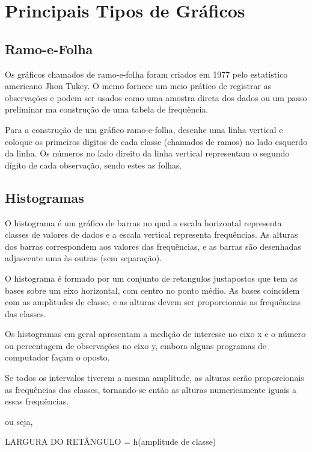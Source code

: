 \newpage
\section{Principais Tipos de Gráficos}

\subsection{Ramo-e-Folha}

Os gráficos chamados de ramo-e-folha foram criados em 1977 pelo estatístico americano Jhon Tukey. O memo fornece um meio prático de registrar as observações e podem ser usados como uma amostra direta dos dados ou um passo preliminar ma construção de uma tabela de frequência.\vskip0.3cm

Para a construção de um gráfico ramo-e-folha, desenhe uma linha vertical e coloque os primeiros digitos de cada classe (chamados de ramos) no lado esquerdo da linha. Os números no lado direito da linha vertical representam o segundo dígito de cada observação, sendo estes as folhas.



\subsection{Histogramas}

\inic O histograma é um gráfico de barras no qual a escala horizontal representa classes de valores de dados e a escala vertical representa frequências. As alturas dos barras correspondem aos valores das frequências, e as barras são desenhadas adjascente uma às outras (sem separação).
 \vskip0.3cm
 
\inic O histograma é formado por um conjunto de retangulos justapostos
que tem as bases sobre um eixo horizontal, com centro no ponto
médio. As bases coincidem com as amplitudes de classe, e as
alturas devem ser proporcionais as frequências das
classes.
\vskip0.3cm 
 

\inic Os histogramas em geral apresentam a medição de interesse no eixo
x e o número ou percentagem de observações no eixo y, embora
alguns programas de computador façam o oposto. 
\vskip0.3cm

Se todos os intervalos tiverem a mesma amplitude, as alturas serão
proporcionais as frequências das classes, tornando-se então as
alturas numericamente iguais a essas frequências.\vskip0.3cm

ou seja,\vskip0.3cm

LARGURA DO RETÂNGULO = h(amplitude de classe)

